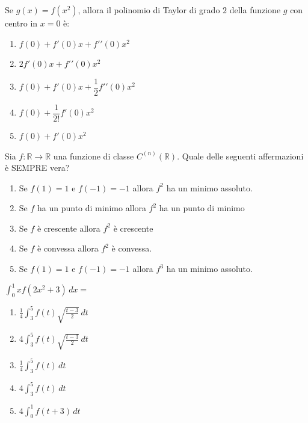\begin{quiz}
Se $g(x)=f(x^2)$, allora il polinomio di Taylor di grado $2$ della funzione $g$ con centro in $x=0$ \`e:
\begin{enumerate}
\item $f(0)+f\prime(0)x+f\prime\prime(0)x^2$
\item $2f\prime(0)x+f\prime\prime(0)x^2$
\item $f(0)+f\prime(0)x+\dfrac12f\prime\prime(0)x^2$
\item $f(0)+\dfrac1{2!}f\prime(0)x^2$
\item $f(0)+f\prime(0)x^2$
\end{enumerate}
\end{quiz}

\begin{quiz}
Sia $f:\mathbb R\to\mathbb R$ una funzione di classe $C^{(n)}(\mathbb R)$. Quale delle seguenti affermazioni \`e SEMPRE vera?
\begin{enumerate}
\item Se $f(1)=1$ e $f(-1)=-1$ allora $f^2$ ha un minimo assoluto.
\item Se $f$ ha un punto di minimo allora $f^2$ ha un punto di minimo
\item Se $f$ \`e crescente allora $f^2$ \`e crescente
\item Se $f$ \`e convessa allora $f^2$ \`e convessa.
\item Se $f(1)=1$ e $f(-1)=-1$ allora $f^3$ ha un minimo assoluto.
\end{enumerate}
\end{quiz}

\begin{quiz}
$\displaystyle\int_0^1xf(2x^2+3)\,dx=$
\begin{enumerate}
\item $\displaystyle\frac14\int_3^5f(t)\sqrt{\frac{t-3}{2}}\,dt$
\item $\displaystyle4\int_3^5f(t)\sqrt{\frac{t-3}{2}}\,dt$
\item $\displaystyle\frac14\int_3^5f(t)\,dt$
\item $\displaystyle4\int_3^5f(t)\,dt$
\item $\displaystyle4\int_0^1f(t+3)\,dt$
\end{enumerate}
\end{quiz}

